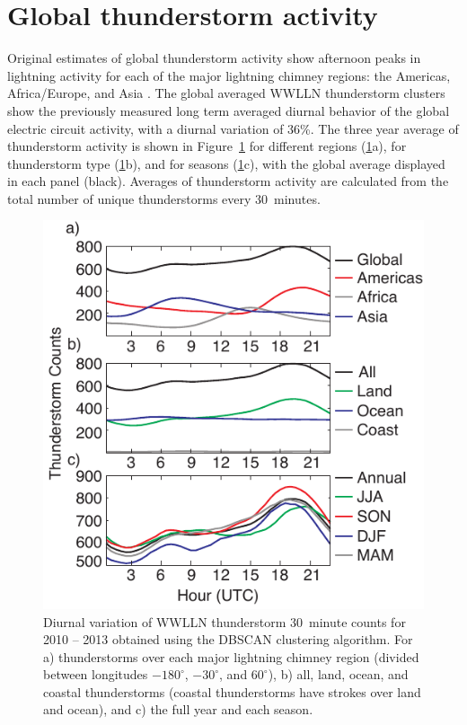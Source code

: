 \section{Global thunderstorm activity}

Original estimates of global thunderstorm activity show afternoon peaks in lightning activity for each of the major lightning chimney regions: the Americas, Africa/Europe, and Asia \citep{Wilson1921}.
The global averaged WWLLN thunderstorm clusters show the previously measured long term averaged diurnal behavior of the global electric circuit activity, with a diurnal variation of 36\%.
The three year average of thunderstorm activity is shown in Figure~\ref{gec:fig:carnegie} for different regions (\ref{gec:fig:carnegie}a), for thunderstorm type (\ref{gec:fig:carnegie}b), and for seasons (\ref{gec:fig:carnegie}c), with the global average displayed in each panel (black).
Averages of thunderstorm activity are calculated from the total number of unique thunderstorms every 30~minutes.

 \begin{figure}[ht!]
    \centering
     \includegraphics[scale=1]{GEC/Figures/carnegie.pdf}
    \caption{Diurnal variation of WWLLN thunderstorm 30~minute counts for 2010 -- 2013 obtained using the DBSCAN clustering algorithm.
    		 For a) thunderstorms over each major lightning chimney region (divided between longitudes $-180^\circ$, $-30^\circ$, and $60^\circ$),
		 b) all, land, ocean, and coastal thunderstorms (coastal thunderstorms have strokes over land and ocean),
		 and c) the full year and each season.
		 }
    \label{gec:fig:carnegie}
 \end{figure}

